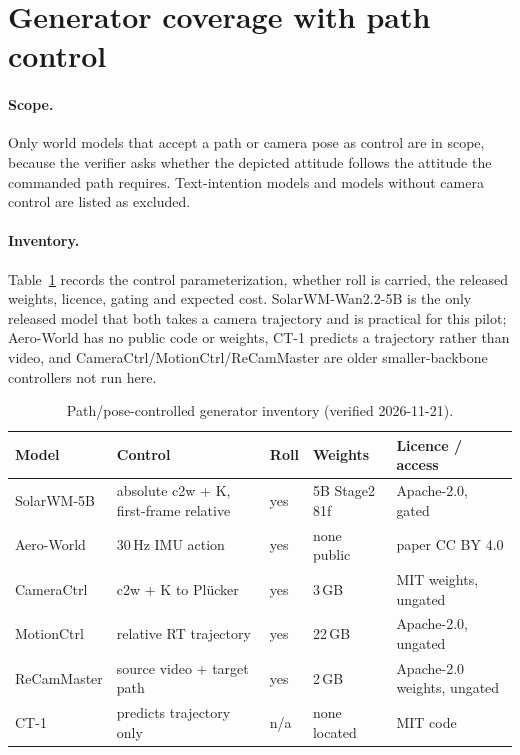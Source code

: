\section{Generator coverage with path control}
\label{sec:h02-generator-coverage}

\paragraph{Scope.}
Only world models that accept a path or camera pose as control are in scope, because the
verifier asks whether the depicted attitude follows the attitude the commanded path requires.
Text-intention models and models without camera control are listed as excluded.

\paragraph{Inventory.}
Table~\ref{tab:h02-inventory} records the control parameterization, whether roll is carried,
the released weights, licence, gating and expected cost. SolarWM-Wan2.2-5B is the only
released model that both takes a camera trajectory and is practical for this pilot;
Aero-World has no public code or weights, CT-1 predicts a trajectory rather than video, and
CameraCtrl/MotionCtrl/ReCamMaster are older smaller-backbone controllers not run here.

\begin{table}[t]
\centering
\small
\begin{tabular}{@{}lllll@{}}
\toprule
Model & Control & Roll & Weights & Licence / access \\
\midrule
SolarWM-5B & absolute c2w + K, first-frame relative & yes & 5B Stage2 81f & Apache-2.0, gated \\
Aero-World & 30\,Hz IMU action & yes & none public & paper CC BY 4.0 \\
CameraCtrl & c2w + K to Pl\"ucker & yes & 3\,GB & MIT weights, ungated \\
MotionCtrl & relative RT trajectory & yes & 22\,GB & Apache-2.0, ungated \\
ReCamMaster & source video + target path & yes & 2\,GB & Apache-2.0 weights, ungated \\
CT-1 & predicts trajectory only & n/a & none located & MIT code \\
\bottomrule
\end{tabular}
\caption{Path/pose-controlled generator inventory (verified 2026-11-21).}
\label{tab:h02-inventory}
\end{table}

